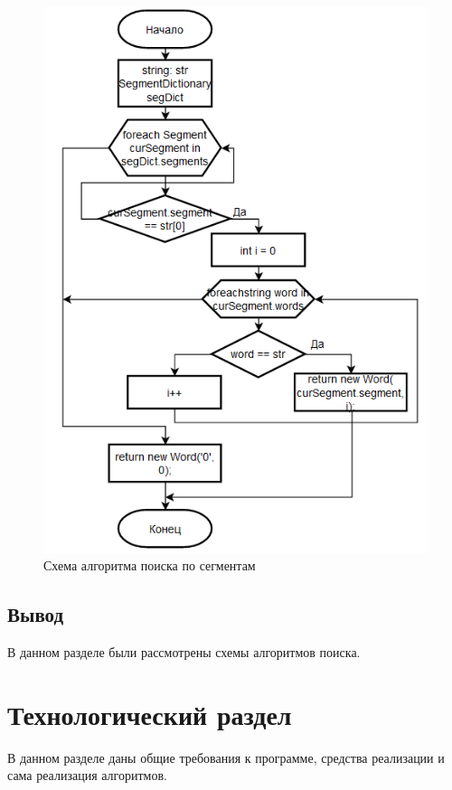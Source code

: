 \documentclass[14pt, a4paper]{extarticle}
\begin{document}
\begin{figure}[h!]
	\centering
	\includegraphics[scale=1]{source/alg3.png}
	\caption{Схема алгоритма поиска по сегментам}
	\label{Schema3}
\end{figure}	
\subsection{Вывод}
В данном разделе были рассмотрены схемы алгоритмов поиска.

\clearpage
\section{Технологический раздел}
В данном разделе даны общие требования к программе, средства реализации и сама реализация алгоритмов.
\end{document}
